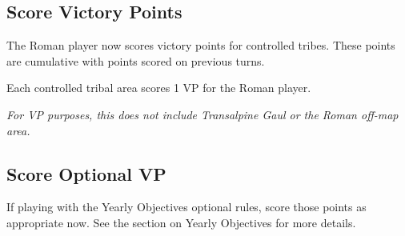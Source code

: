 \subsection{Score Victory Points}
\par
The Roman player now scores victory points for controlled tribes. These points are cumulative with points scored on previous turns.

Each controlled tribal area scores 1 VP for the Roman player.

\textit{For VP purposes, this does not include Transalpine Gaul or the Roman off-map area.}

\subsection{Score Optional VP}
If playing with the Yearly Objectives optional rules, score those points as appropriate now. See the section on Yearly Objectives for more details.
